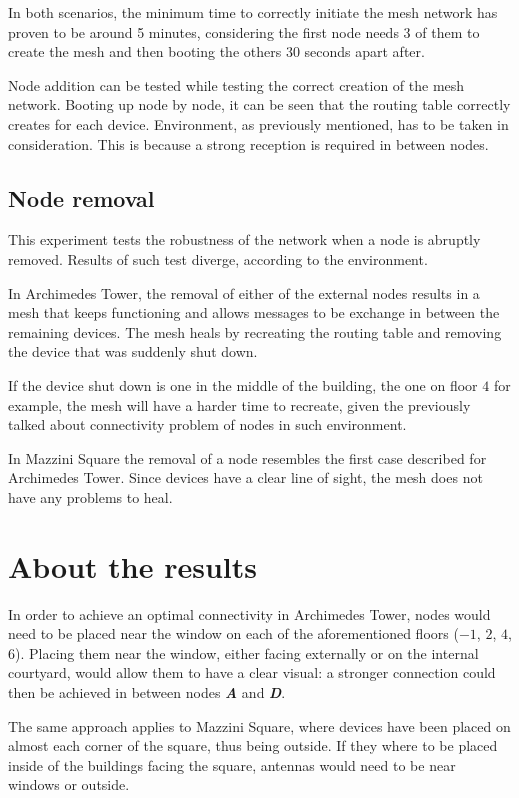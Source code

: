 			In both scenarios, the minimum time to correctly initiate the mesh network has proven to be around 5 minutes, considering the first node needs 3 of them to create the mesh and then booting the others 30 seconds apart after.
			
			Node addition can be tested while testing the correct creation of the mesh network.
			Booting up node by node, it can be seen that the routing table correctly creates for each device.
			Environment, as previously mentioned, has to be taken in consideration.
			This is because a strong reception is required in between nodes.
			
		\subsection{Node removal}
		
			This experiment tests the robustness of the network when a node is abruptly removed.
			Results of such test diverge, according to the environment.
			
			In Archimedes Tower, the removal of either of the external nodes results in a mesh that keeps functioning and allows messages to be exchange in between the remaining devices.
			The mesh heals by recreating the routing table and removing the device that was suddenly shut down.
			
			If the device shut down is one in the middle of the building, the one on floor $4$ for example, the mesh will have a harder time to recreate, given the previously talked about connectivity problem of nodes in such environment.
			
			In Mazzini Square the removal of a node resembles the first case described for Archimedes Tower.
			Since devices have a clear line of sight, the mesh does not have any problems to heal.
	
	\section{About the results}
		
		In order to achieve an optimal connectivity in Archimedes Tower, nodes would need to be placed near the window on each of the aforementioned floors ($-1$, $2$, $4$, $6$).
		Placing them near the window, either facing externally or on the internal courtyard, would allow them to have a clear visual: a stronger connection could then be achieved in between nodes \textbf{\textit{A}} and \textbf{\textit{D}}.
		
		The same approach applies to Mazzini Square, where devices have been placed on almost each corner of the square, thus being outside.
		If they where to be placed inside of the buildings facing the square, antennas would need to be near windows or outside.
		
